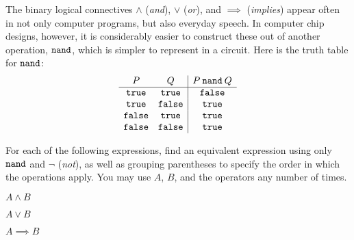 \documentclass[twoside,12pt]{article}
\begin{document}
\begin{problem}{24}

The binary logical connectives $\wedge$ (\emph{and}), $\vee$ (\emph{or}), and $\implies$ (\emph{implies})
appear often in not only computer programs, but also everyday speech. 
In computer chip designs, however, it is considerably easier to construct these out of another operation, $\mathbin{\mathtt{nand}}$, which is simpler to represent in a circuit.  Here is the truth table for $\mathbin{\mathtt{nand}}$:
%
\[
\begin{array}{cc|c}
P & Q & P \mathbin{\mathtt{nand}} Q \\ \hline
\mathbin{\mathtt{true}} & \mathbin{\mathtt{true}} & \mathbin{\mathtt{false}} \\
\mathbin{\mathtt{true}} & \mathbin{\mathtt{false}} & \mathbin{\mathtt{true}} \\
\mathbin{\mathtt{false}} & \mathbin{\mathtt{true}} & \mathbin{\mathtt{true}} \\
\mathbin{\mathtt{false}} & \mathbin{\mathtt{false}} & \mathbin{\mathtt{true}}
\end{array}
\]
%

%
\bparts

 For each of the following expressions, find an equivalent expression
using only $\mathbin{\mathtt{nand}}$ and $\neg$ (\emph{not}), as well as grouping parentheses to specify the order in which the operations apply. You may use $A$, $B$, and the operators any number of times.

\bsubparts
\psubpart $A \wedge B$


\psubpart $A \vee B$


\psubpart $A \implies B$

\esubparts




\end{problem}
\end{document}
